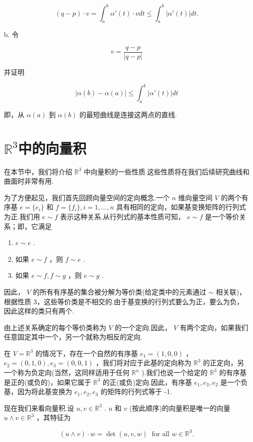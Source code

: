 \[
(q - p)  \cdot  v = \int_{a}^{b} \alpha'(t)  \cdot  v dt \leq  \int_{a}^{b} |\alpha'(t)| dt.
\]

b. 令

\[
v = \frac{q - p}{|q - p|}
\]

并证明

\[
|\alpha(b)  - \alpha(a)|  \leq  \int_{a}^{b} |\alpha'(t)| dt
\]

即，从 $\alpha(a)$ 到 $\alpha(b)$ 的最短曲线是连接这两点的直线.

\section{$\mathbb{R}^3$中的向量积}

在本节中，我们将介绍 $\mathbb{R}^3$ 中向量积的一些性质.这些性质将在我们后续研究曲线和曲面时非常有用.

为了方便起见，我们首先回顾向量空间的定向概念.一个 $n$ 维向量空间 $V$ 的两个有序基 $e = \{e_i\}$ 和 $f = \{f_i\}  ,i = 1,\ldots ,n$ 具有相同的定向，如果基变换矩阵的行列式为正.我们用 $e \sim  f$ 表示这种关系.从行列式的基本性质可知， $e \sim  f$ 是一个等价关系；即，它满足
\begin{enumerate}
    \item $e \sim  e$ .
    \item 如果 $e \sim  f$ ，则 $f \sim  e$ .
    \item 如果 $e \sim  f,f \sim  g$ ，则 $e \sim  g$ .
\end{enumerate}
因此， $V$ 的所有有序基的集合被分解为等价类(给定类中的元素通过 $\sim$ 相关联)，根据性质 3，这些等价类是不相交的.由于基变换的行列式要么为正，要么为负，因此这样的类只有两个.

由上述关系确定的每个等价类称为 $V$ 的一个定向.因此， $V$ 有两个定向，如果我们任意固定其中一个，另一个就称为相反的定向.

在 $V = \mathbb{R}^3$ 的情况下，存在一个自然的有序基 $e_1 = (1,0,0)$ ， $e_2 = (0,1,0) ,e_3 = (0,0,1)$ ，我们将对应于此基的定向称为 $\mathbb{R}^3$ 的正定向，另一个称为负定向(当然，这同样适用于任何 $\mathbb{R}^n$ ).我们也说一个给定的 $\mathbb{R}^3$ 的有序基是正的(或负的)，如果它属于 $\mathbb{R}^3$ 的正(或负)定向.因此，有序基 $e_1,e_3,e_2$ 是一个负基，因为将此基变换为 $e_1,e_2,e_3$ 的矩阵的行列式等于 -1.

现在我们来看向量积.设 $u,v \in  \mathbb{R}^3$ . $u$ 和 $v$ (按此顺序)的向量积是唯一的向量 $u \land  v \in  \mathbb{R}^3$ ，其特征为

\[
(u \land  v)  \cdot  w = \det(u,v,w) \;\text{ for all }w \in  \mathbb{R}^3.
\]

